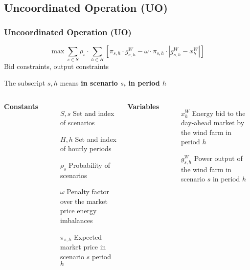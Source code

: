 \subsection{Uncoordinated Operation (UO)}
\begin{frame}
  \frametitle{Uncoordinated Operation (UO)}
\begin{tcolorbox}[colback=white!5,colframe=white!40!black,title= Model of Wind Power]
  \begin{equation}
    \max{
      \sum_{s\in S} \rho_s \cdot \sum_{h\in H}[\pi_{s,h}\cdot g_{s,h}^W - \omega\cdot\pi_{s,h}\cdot|g_{s,h}^W - x_{h}^W|]
}
  \end{equation}
Bid constraints, output constraints
\end{tcolorbox}
The subscript $s,h$ means \textbf{in scenario $s$, in period $h$}
\begin{columns}
\textbf{Constants}
\begin{itemize}
\item[$S, s$] Set and index of scenarios
\item[$H, h$] Set and index of hourly periods
\item[$\rho_s$] Probability of scenarios
\item[$\omega$] Penalty factor over the market price energy imbalances
\item[$\pi_{s,h}$] Expected market price in scenario $s$ period $h$
\end{itemize}

\textbf{Variables}
\begin{itemize}
\item[$x_{h}^W$] Energy bid to the day-ahead market by the wind farm in period $h$
\item[$g_{s,h}^W$] Power output of the wind farm in scenario $s$ in period $h$
\end{itemize}
\end{columns}
\end{frame}

